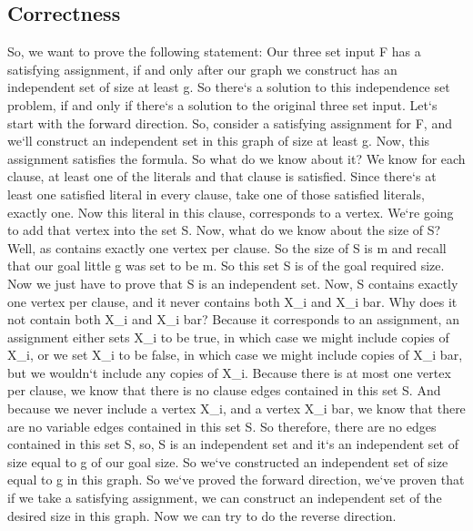 \subsection{Correctness}
So, we want to prove the following statement: Our three set input F has a satisfying assignment, if and only after our graph we construct has an independent set of size at least g.
So there`s a solution to this independence set problem, if and only if there`s a solution to the original three set input.
Let`s start with the forward direction.
So, consider a satisfying assignment for F, and we`ll construct an independent set in this graph of size at least g.
Now, this assignment satisfies the formula.
So what do we know about it? We know for each clause, at least one of the literals and that clause is satisfied.
Since there`s at least one satisfied literal in every clause, take one of those satisfied literals, exactly one.
Now this literal in this clause, corresponds to a vertex.
We`re going to add that vertex into the set S\@.
Now, what do we know about the size of S? Well, as contains exactly one vertex per clause.
So the size of S is m and recall that our goal little g was set to be m.
So this set S is of the goal required size.
Now we just have to prove that S is an independent set.
Now, S contains exactly one vertex per clause, and it never contains both X\_i and X\_i bar.
Why does it not contain both X\_i and X\_i bar? Because it corresponds to an assignment, an assignment either sets X\_i to be true, in which case we might include copies of X\_i, or we set X\_i to be false, in which case we might include copies of X\_i bar, but we wouldn`t include any copies of X\_i.
Because there is at most one vertex per clause, we know that there is no clause edges contained in this set S\@.
And because we never include a vertex X\_i, and a vertex X\_i bar, we know that there are no variable edges contained in this set S\@.
So therefore, there are no edges contained in this set S, so, S is an independent set and it`s an independent set of size equal to g of our goal size.
So we`ve constructed an independent set of size equal to g in this graph.
So we`ve proved the forward direction, we`ve proven that if we take a satisfying assignment, we can construct an independent set of the desired size in this graph.
Now we can try to do the reverse direction.

